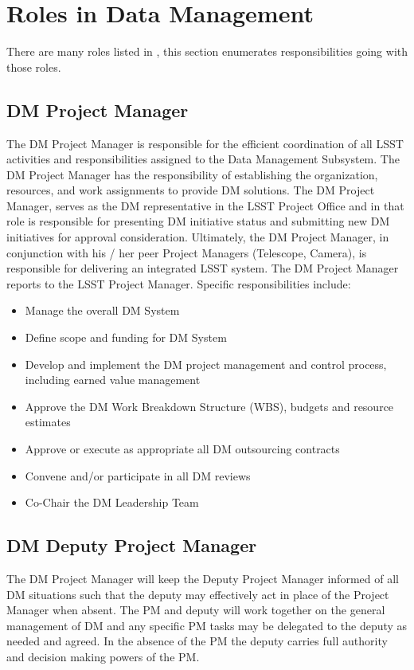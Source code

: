 \section{Roles in Data Management}

There are many roles listed in , this section enumerates responsibilities going with those roles. 


\subsection{DM Project Manager \label{role:dmpm}}

The DM Project Manager is responsible for the efficient coordination of all LSST activities and responsibilities assigned to the Data Management Subsystem. The DM Project Manager has the responsibility of establishing the organization, resources, and work assignments to provide DM solutions.  The DM Project Manager, serves as the DM representative in the LSST Project Office and in that role is responsible for presenting DM initiative status and submitting new DM initiatives for approval consideration. Ultimately, the DM Project Manager, in conjunction with his / her peer Project Managers (Telescope, Camera), is responsible for delivering an integrated LSST system. The DM Project Manager reports to the LSST Project Manager. Specific responsibilities include:

\begin{itemize}
\item Manage the overall DM System
\item Define scope and funding for DM System 
\item Develop and implement the DM project management and control process, including earned value management
\item Approve the DM Work Breakdown Structure (WBS), budgets and resource estimates
\item Approve or execute as appropriate all DM outsourcing contracts 
\item Convene and/or participate in all DM reviews
\item Co-Chair the DM Leadership Team
\end{itemize}

\subsection{DM Deputy Project Manager \label{role:dmdpm}}
The DM Project Manager will keep the Deputy Project Manager informed of all DM situations such that the deputy may effectively act in place of the Project Manager when absent. 
The PM and deputy will work together on the general management of DM and any specific PM tasks may be delegated to the deputy as needed and agreed. In the absence of the PM the deputy carries full authority and decision making powers of the PM. 

